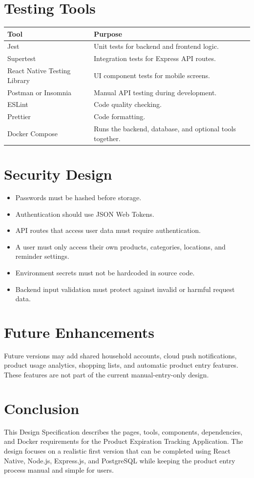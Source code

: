\documentclass[12pt]{article}
\begin{document}
\section{Testing Tools}

\begin{longtable}{|p{}|p{}|}
\hline
\textbf{Tool} & \textbf{Purpose} \\
\hline
Jest & Unit tests for backend and frontend logic. \\
\hline
Supertest & Integration tests for Express API routes. \\
\hline
React Native Testing Library & UI component tests for mobile screens. \\
\hline
Postman or Insomnia & Manual API testing during development. \\
\hline
ESLint & Code quality checking. \\
\hline
Prettier & Code formatting. \\
\hline
Docker Compose & Runs the backend, database, and optional tools together. \\
\hline
\end{longtable}

\section{Security Design}

\begin{itemize}[leftmargin=*]
    \item Passwords must be hashed before storage.
    \item Authentication should use JSON Web Tokens.
    \item API routes that access user data must require authentication.
    \item A user must only access their own products, categories, locations, and reminder settings.
    \item Environment secrets must not be hardcoded in source code.
    \item Backend input validation must protect against invalid or harmful request data.
\end{itemize}

\section{Future Enhancements}

Future versions may add shared household accounts, cloud push notifications, product usage analytics, shopping lists, and automatic product entry features. These features are not part of the current manual-entry-only design.

\section{Conclusion}

This Design Specification describes the pages, tools, components, dependencies, and Docker requirements for the Product Expiration Tracking Application. The design focuses on a realistic first version that can be completed using React Native, Node.js, Express.js, and PostgreSQL while keeping the product entry process manual and simple for users.
\end{document}
